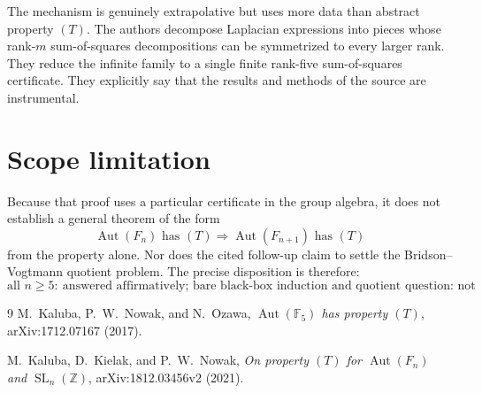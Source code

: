 \documentclass[11pt]{article}
\newcommand{\Aut}{\operatorname{Aut}}
\begin{document}
The mechanism is genuinely extrapolative but uses more data than abstract
property $(T)$.  The authors decompose Laplacian expressions into pieces whose
rank-$m$ sum-of-squares decompositions can be symmetrized to every larger
rank.  They reduce the infinite family to a single finite rank-five
sum-of-squares certificate.  They explicitly say that the results and methods
of the source are instrumental.

\section{Scope limitation}

Because that proof uses a particular certificate in the group algebra, it
does not establish a general theorem of the form
\[
 \Aut(F_n)\text{ has }(T)\Longrightarrow \Aut(F_{n+1})\text{ has }(T)
\]
from the property alone.  Nor does the cited follow-up claim to settle the
Bridson--Vogtmann quotient problem.  The precise disposition is therefore:
\[
 \boxed{\text{all }n\geq5:\ \text{answered affirmatively;
 bare black-box induction and quotient question: not claimed.}}
\]

\begin{thebibliography}{9}
M.~Kaluba, P.~W.~Nowak, and N.~Ozawa,
\emph{$\Aut(\mathbb F_5)$ has property $(T)$},
arXiv:1712.07167 (2017).

M.~Kaluba, D.~Kielak, and P.~W.~Nowak,
\emph{On property $(T)$ for $\Aut(F_n)$ and $\operatorname{SL}_n(\mathbb Z)$},
arXiv:1812.03456v2 (2021).
\end{thebibliography}
\end{document}
